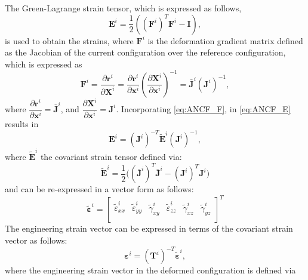 The Green-Lagrange strain tensor, which is expressed as follows, 
\begin{equation} 
{{\mathbf{E}}^{i}}=\frac{1}{2}\left( {{\left( {{\mathbf{F}}^{i}} \right)}^{T}}{{\mathbf{F}}^{i}}-\mathbf{I} \right),
\label{eq:ANCF_E}
\end{equation}
is used to obtain the strains, where ${\mathbf{F}}^{i}$ is the deformation gradient matrix defined as the Jacobian of the current configuration over the reference configuration, which is expressed as 
\begin{equation} 
{{\mathbf{F}}^{i}}=\frac{\partial {{\mathbf{r}}^{i}}}{\partial {{\mathbf{X}}^{i}}}=\frac{\partial {{\mathbf{r}}^{i}}}{\partial {{\mathbf{x}}^{i}}}{{\left( \frac{\partial {{\mathbf{X}}^{i}}}{\partial {{\mathbf{x}}^{i}}} \right)}^{-1}}=  \bar {\bm J}^i  ({\bm J^i})^{-1}, \label{eq:ANCF_F}
\end{equation}
where $\dfrac{\partial {{\mathbf{r}}^{i}}}{\partial {{\mathbf{x}}^{i}}}=\bar {\bm J}^i$, and ${{ \dfrac{\partial {{\mathbf{X}}^{i}}}{\partial {{\mathbf{x}}^{i}}} }}= {\bm J^i}$. Incorporating \ref{eq:ANCF_F}, in \ref{eq:ANCF_E} results in
\begin{equation}
\bm{E}^i=({\bm{J}^i})^{-T} \tilde{\bm{E}}^i ({\bm{J}^i})^{-1},
\label{eq:ANCF_E2}
\end{equation}
where $\tilde{\bm{E}}^i$ the covariant strain tensor defined via:
\begin{equation}
{\tilde{\bm{E}}}^i=\frac{1}{2}\big( (\bar {\bm J}^i)^{T}  \bar {\bm J}^i -  (\bm J^i)^{T}  {\bm J}^i  \big)
\label{eq:ANCF_E_tilde}
\end{equation}
and can be re-expressed in a vector form as follows:
\begin{equation} \label{eq:equ7}
{{\bm{\tilde{\varepsilon} }}^{i}}={{\left[ \begin{matrix}
		\tilde{\varepsilon} _{xx}^{i} & \tilde{\varepsilon} _{yy}^{i} & \tilde{\gamma} _{xy}^{i} & \tilde{\varepsilon} _{zz}^{i} & \tilde{\gamma} _{xz}^{i} & \tilde{\gamma} _{yz}^{i} \\
		\end{matrix} \right]}^{T}}
\end{equation}
The engineering strain vector can be expressed in terms of the covariant strain vector as follows:
\begin{equation}
{{\bm{\varepsilon }}^{i}}=(\bm {T}^i)^{-T} {{\bm{\tilde{\varepsilon} }}^{i}},
\end{equation}
where the  engineering strain vector in the deformed configuration is defined via  

